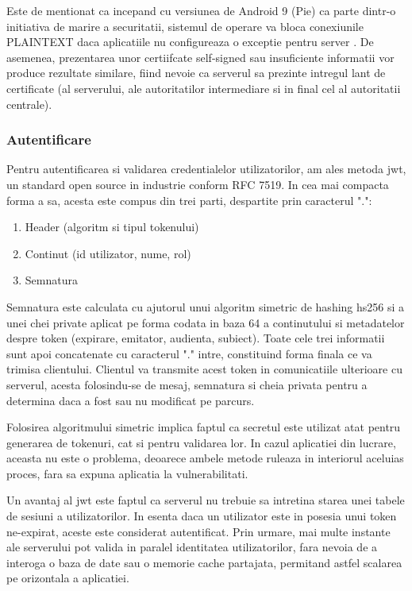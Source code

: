 Este de mentionat ca incepand cu versiunea de Android 9 (Pie) ca parte dintr-o initiativa de marire a securitatii, sistemul de operare va bloca conexiunile PLAINTEXT daca aplicatiile nu configureaza o exceptie pentru server \cite{Digicert2018}. De asemenea, prezentarea unor certiifcate self-signed sau insuficiente informatii vor produce rezultate similare, fiind nevoie ca serverul sa prezinte intregul lant de certificate (al serverului, ale autoritatilor intermediare si in final cel al autoritatii centrale). 

\subsubsection {Autentificare}

Pentru autentificarea si validarea credentialelor utilizatorilor, am ales metoda \acrfull{jwt}, un standard open source in industrie conform RFC 7519. In cea mai compacta forma a sa, acesta este compus din trei parti, despartite prin caracterul ".":

\begin{enumerate}
  \item Header (algoritm si tipul tokenului)
  \item Continut (id utilizator, nume, rol)
  \item Semnatura
\end{enumerate}

Semnatura este calculata cu ajutorul unui algoritm simetric de hashing \acrfull{hs256} si a unei chei private aplicat pe forma codata in baza 64 a continutului si metadatelor despre token (expirare, emitator, audienta, subiect). Toate cele trei informatii sunt apoi concatenate cu caracterul "." intre, constituind forma finala ce va trimisa clientului. Clientul va transmite acest token in comunicatiile ulterioare cu serverul, acesta folosindu-se de mesaj, semnatura si cheia privata pentru a determina daca a fost sau nu modificat pe parcurs.

Folosirea algoritmului simetric implica faptul ca secretul este utilizat atat pentru generarea de tokenuri, cat si pentru validarea lor. In cazul aplicatiei din lucrare, aceasta nu este o problema, deoarece ambele metode ruleaza in interiorul aceluias proces, fara sa expuna aplicatia la vulnerabilitati.

Un avantaj al \acrshort{jwt} este faptul ca serverul nu trebuie sa intretina starea unei tabele de sesiuni a utilizatorilor. In esenta daca un utilizator este in posesia unui token ne-expirat, aceste este considerat autentificat. Prin urmare, mai multe instante ale serverului pot valida in paralel identitatea utilizatorilor, fara nevoia de a interoga o baza de date sau o memorie cache partajata, permitand astfel scalarea pe orizontala a aplicatiei.

